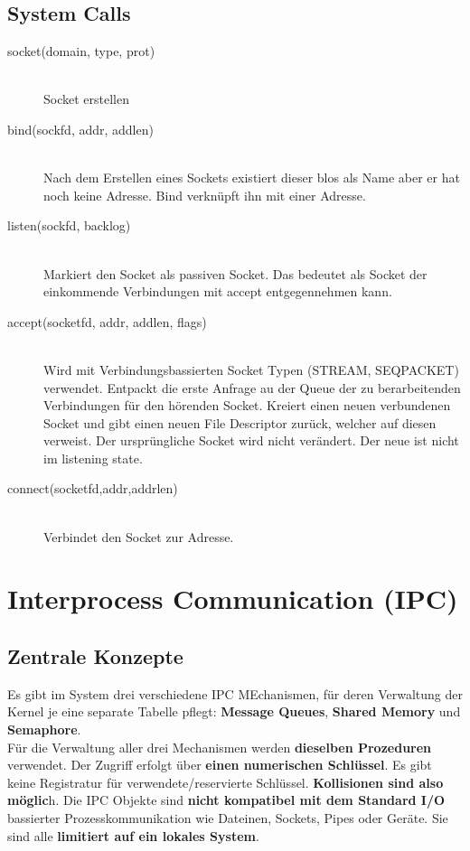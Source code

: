 \documentclass[10pt]{article}
\begin{document}
\subsection{System Calls}
\begin{description}
	\item[socket(domain, type, prot)] \hfill \\ Socket erstellen
	\item[bind(sockfd, addr, addlen)] \hfill	\\ Nach dem Erstellen eines Sockets existiert dieser blos als Name aber er hat noch keine Adresse. Bind verknüpft ihn mit einer Adresse.
	\item[listen(sockfd, backlog)] \hfill \\ Markiert den Socket als passiven Socket. Das bedeutet als Socket der einkommende Verbindungen mit accept entgegennehmen kann.
	\item[accept(socketfd, addr, addlen, flags)] \hfill \\ Wird mit Verbindungsbassierten Socket Typen (STREAM, SEQPACKET) verwendet. Entpackt die erste Anfrage au der Queue der zu berarbeitenden Verbindungen für den hörenden Socket. Kreiert einen neuen verbundenen Socket und gibt einen neuen File Descriptor zurück, welcher auf diesen verweist. Der ursprüngliche Socket wird nicht verändert. Der neue ist nicht im listening state.
	\item[connect(socketfd,addr,addrlen)] \hfill \\ Verbindet den Socket zur Adresse.
\end{description}


\newpage
\section{Interprocess Communication (IPC)}
\subsection{Zentrale Konzepte}
Es gibt im System drei verschiedene IPC MEchanismen, für deren Verwaltung der Kernel je eine separate Tabelle pflegt: \textbf{Message Queues}, \textbf{Shared Memory} und \textbf{Semaphore}. \\
Für die Verwaltung  aller drei Mechanismen werden \textbf{dieselben Prozeduren} verwendet. Der Zugriff erfolgt über \textbf{einen numerischen Schlüssel}. Es gibt keine Registratur für verwendete/reservierte Schlüssel. \textbf{Kollisionen sind also möglic}h. Die IPC Objekte sind \textbf{nicht kompatibel mit dem Standard I/O} bassierter Prozesskommunikation wie Dateinen, Sockets, Pipes oder Geräte. Sie sind alle \textbf{limitiert auf ein lokales System}.
\end{document}
